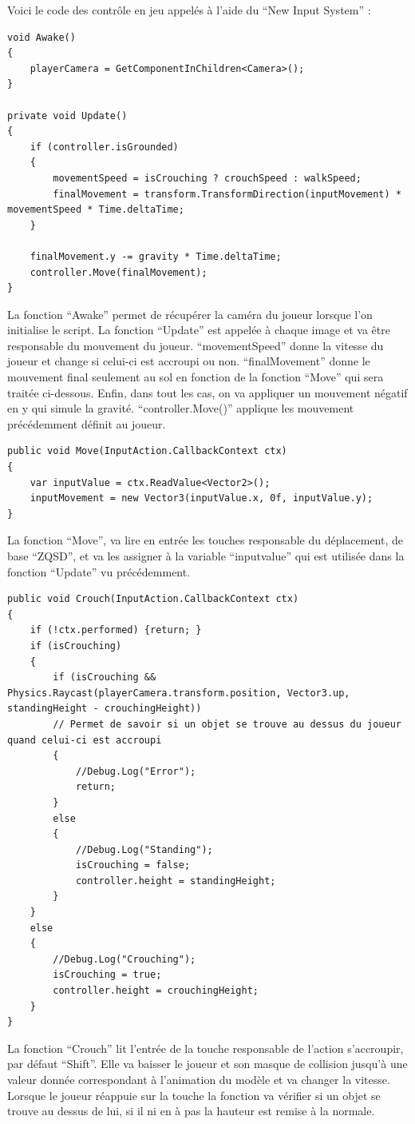 Voici le code des contrôle en jeu appelés à l'aide du ``New Input System'' :
\newline

\begin{lstlisting}[language={[Sharp]C}, caption={Fonctions C\# Awake / Update}, label={Script}]
void Awake()
{
	playerCamera = GetComponentInChildren<Camera>();
}

private void Update()
{
	if (controller.isGrounded)
	{
		movementSpeed = isCrouching ? crouchSpeed : walkSpeed;
		finalMovement = transform.TransformDirection(inputMovement) * movementSpeed * Time.deltaTime;
	}

	finalMovement.y -= gravity * Time.deltaTime;
    controller.Move(finalMovement);
}
\end{lstlisting}
La fonction ``Awake'' permet de récupérer la caméra du joueur lorsque l'on initialise le script.
La fonction ``Update'' est appelée à chaque image et va être responsable du mouvement du joueur.
``movementSpeed'' donne la vitesse du joueur et change si celui-ci est accroupi ou non.
``finalMovement'' donne le mouvement final seulement au sol en fonction de la fonction ``Move'' qui sera traitée ci-dessous.
Enfin, dans tout les cas, on va appliquer un mouvement négatif en y qui simule la gravité.
``controller.Move()'' applique les mouvement précédemment définit au joueur.
\newline

\begin{lstlisting}[language={[Sharp]C}, caption={Fonction C\# Move}, label={Script}]
public void Move(InputAction.CallbackContext ctx)
{
    var inputValue = ctx.ReadValue<Vector2>();
    inputMovement = new Vector3(inputValue.x, 0f, inputValue.y);
}
\end{lstlisting}
La fonction ``Move'', va lire en entrée les touches responsable du déplacement, de base ``ZQSD'', et va les assigner à la variable ``inputvalue'' qui est utilisée dans la fonction ``Update'' vu précédemment.
\newline

\begin{lstlisting}[language={[Sharp]C}, caption={Fonction C\# Crouch}, label={Script}]
public void Crouch(InputAction.CallbackContext ctx)
{
    if (!ctx.performed) {return; }
	if (isCrouching)
	{
		if (isCrouching && Physics.Raycast(playerCamera.transform.position, Vector3.up, standingHeight - crouchingHeight))
		// Permet de savoir si un objet se trouve au dessus du joueur quand celui-ci est accroupi
		{
			//Debug.Log("Error");
			return;
		}
		else
		{
			//Debug.Log("Standing");
			isCrouching = false;
			controller.height = standingHeight;
		}
	}
	else
	{
		//Debug.Log("Crouching");
		isCrouching = true;
		controller.height = crouchingHeight;
	}
}
\end{lstlisting}
La fonction ``Crouch'' lit l'entrée de la touche responsable de l'action s'accroupir, par défaut ``Shift''. Elle va baisser le joueur et son masque de collision jusqu'à une valeur donnée correspondant à l'animation du modèle et va changer la vitesse. Lorsque le joueur réappuie sur la touche la fonction va vérifier si un objet se trouve au dessus de lui, si il ni en à pas la hauteur est remise à la normale.
\newline

